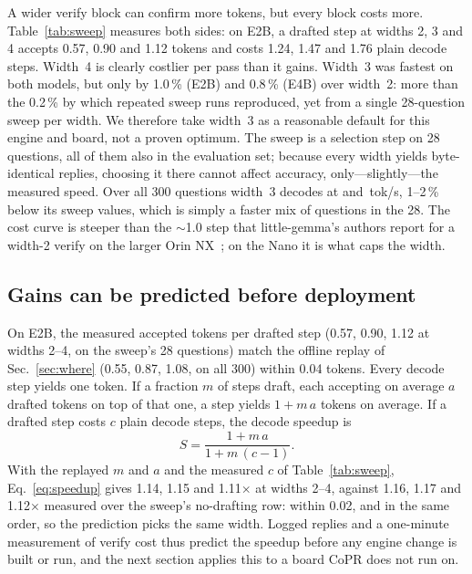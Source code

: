 \documentclass[lettersize,journal]{IEEEtran}
\newcommand{\sys}{CoPR}
\newcommand{\lgm}{little-gemma}
\begin{document}
A wider verify block can confirm more tokens, but every block costs more.
Table~\ref{tab:sweep} measures both sides: on E2B, a drafted step at widths 2,
3 and 4 accepts 0.57, 0.90 and 1.12 tokens and costs 1.24, 1.47 and 1.76 plain
decode steps. Width~4 is clearly costlier per pass than it gains. Width~3 was
fastest on both models, but only by 1.0\,\% (E2B) and 0.8\,\% (E4B) over
width~2: more than the 0.2\,\% by which repeated sweep runs reproduced, yet from
a single 28-question sweep per width. We therefore take width~3 as a reasonable
default for this engine and board, not a proven optimum. The sweep is a selection step on 28 questions, all of them
also in the evaluation set; because every width yields byte-identical replies,
choosing it there cannot affect accuracy, only---slightly---the measured speed.
Over all 300 questions width~3 decodes at \EtwoDecA{} and \EfourDecA{}\,tok/s,
1--2\,\% below its sweep values, which is simply a faster mix of questions in
the 28. The cost curve is steeper than the $\sim$1.0 step that
\lgm{}'s authors report for a width-2 verify on the larger Orin
NX~\cite{littlegemmarepo}; on the Nano it is what caps the width.

\subsection{Gains can be predicted before deployment}
On E2B, the measured accepted tokens per drafted step (0.57, 0.90, 1.12 at
widths 2--4, on the sweep's 28 questions) match the offline replay of
Sec.~\ref{sec:where} (0.55, 0.87, 1.08, on all 300) within 0.04 tokens. Every decode step yields one token. If a fraction $m$ of steps draft, each
accepting on average $a$ drafted tokens on top of that one, a step yields
$1 + m\,a$ tokens on average. If a drafted step costs $c$ plain decode steps, the
decode speedup is
\begin{equation}\label{eq:speedup}
S = \frac{1 + m\,a}{1 + m\,(c - 1)} .
\end{equation}
With the replayed $m$ and $a$ and the measured $c$ of Table~\ref{tab:sweep},
Eq.~\eqref{eq:speedup} gives 1.14, 1.15 and 1.11$\times$ at widths 2--4,
against 1.16, 1.17 and 1.12$\times$ measured over the sweep's no-drafting row:
within 0.02, and in the same order, so the prediction picks the same width. Logged replies and a one-minute
measurement of verify cost thus predict the speedup before any engine change is
built or run, and the next section applies this to a board \sys{} does not run
on.
\end{document}
